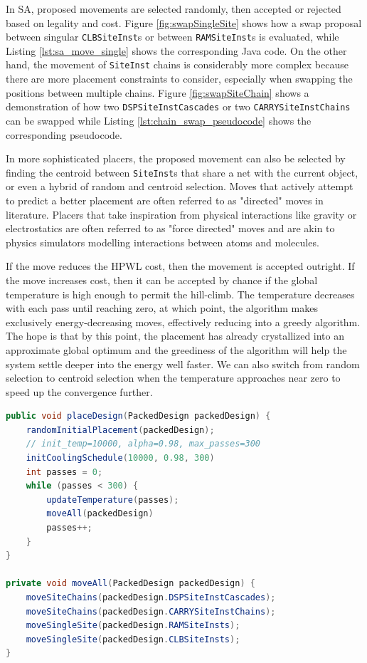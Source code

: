 In SA, proposed movements are selected randomly, then accepted or rejected based on legality and cost. 
Figure \ref{fig:swapSingleSite} shows how a swap proposal between singular \texttt{CLBSiteInst}s or between \texttt{RAMSiteInst}s is evaluated, while Listing \ref{lst:sa_move_single} shows the corresponding Java code.
On the other hand, the movement of \texttt{SiteInst} chains is considerably more complex because there are more placement constraints to consider, especially when swapping the positions between multiple chains.
Figure \ref{fig:swapSiteChain} shows a demonstration of how two \texttt{DSPSiteInstCascades} or two \texttt{CARRYSiteInstChains} can be swapped while Listing \ref{lst:chain_swap_pseudocode} shows the corresponding pseudocode. 

In more sophisticated placers, the proposed movement can also be selected by finding the centroid between \texttt{SiteInst}s that share a net with the current object, or even a hybrid of random and centroid selection. 
Moves that actively attempt to predict a better placement are often referred to as "directed" moves in literature. 
Placers that take inspiration from physical interactions like gravity or electrostatics are often referred to as "force directed" moves and are akin to physics simulators modelling interactions between atoms and molecules. 

If the move reduces the HPWL cost, then the movement is accepted outright.
If the move increases cost, then it can be accepted by chance if the global temperature is high enough to permit the hill-climb.
The temperature decreases with each pass until reaching zero, at which point, the algorithm makes exclusively energy-decreasing moves, effectively reducing into a greedy algorithm. 
The hope is that by this point, the placement has already crystallized into an approximate global optimum and the greediness of the algorithm will help the system settle deeper into the energy well faster. 
We can also switch from random selection to centroid selection when the temperature approaches near zero to speed up the convergence further. 

\newcolumn
\begin{lstlisting}[language=java, caption={SA pseudocode: outer loop}, label={lst:sa_outer}]
public void placeDesign(PackedDesign packedDesign) {
    randomInitialPlacement(packedDesign);
    // init_temp=10000, alpha=0.98, max_passes=300
    initCoolingSchedule(10000, 0.98, 300)
    int passes = 0;
    while (passes < 300) {
        updateTemperature(passes);
        moveAll(packedDesign)
        passes++;
    }
}

private void moveAll(PackedDesign packedDesign) {
    moveSiteChains(packedDesign.DSPSiteInstCascades);
    moveSiteChains(packedDesign.CARRYSiteInstChains);
    moveSingleSite(packedDesign.RAMSiteInsts);
    moveSingleSite(packedDesign.CLBSiteInsts);
}
\end{lstlisting}


